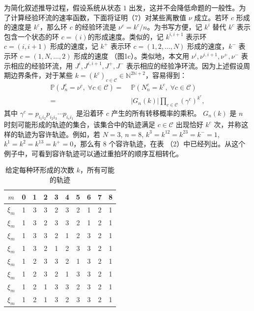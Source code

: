 为简化叙述推导过程，假设系统从状态 $1$ 出发，这并不会降低命题的一般性。为了计算经验环流的速率函数，下面将证明（7）对某些离散值 $\nu$ 成立。若环 $c$ 形成的速度是 $k^c$，那么环 $c$ 的经验环流是 $\nu^c = k^c /n$。为书写方便，记 $k^i$ 替代 $k^c$ 表示包含一个状态的环 $c=(i)$的形成速度。类似的，记 $k^{i,i+1}$ 表示环 $c=(i,i+1)$ 形成的速度，记 $k^+$ 表示环 $c=(1, 2, \dots ,N)$ 形成的速度，$k^-$ 表示环 $c=(1, N, \dots ,2)$ 形成的速度 （图1c）。类似地，本文用 $\nu^i, \nu^{i,i+1}, \nu^+, \nu^-$ 表示相应的经验环流，用 $J^i, J^{i, i+1}, J^{+}, J^{-}$ 表示相应的经验净环流。因为上述假设周期边界条件，对于某些 $k=(k^c)_{c \in \mathcal{C}} \in \mathbb{N}^{2 \mathbb{N}+2}$，容易得到：
\begin{equation}\label{joint}
    \begin{split}
    \mathbb{P}\left(J^c_n=\nu^c,\;\forall c\in\mathcal{C}\right)
    =&\;\mathbb{P}\left(N^c_n=k^c,\;\forall c\in\mathcal{C}\right)\\
    =&\;|G_n(k)|\prod_{c\in\mathcal{C}}\left(\gamma^c\right)^{k^c},
    \end{split}
\end{equation}
其中 $\gamma^c = p_{i_1i_2}p_{i_2i_3}\cdots p_{i_si_1}$ 是沿着环 $c$ 产生的所有转移概率的乘积。 $G_n(k)$ 是 $n$ 时刻可能形成的轨迹的集合，该集合中的轨迹满足 $c \in \mathcal{C}$ 出现恰好 $k^c$ 次，并称这样的轨迹为容许轨迹。例如，若 $N=3$, $n=8$, $k^3 = k^{12} = k^{23} = k^- = 1$, $k^1 = k^2 = k^{13} = k^+= 0$，那么有 8 个容许轨迹，在表 （2）中已经列出。从这个例子中，可看到容许轨迹可以通过重拍环的顺序互相转化。
\begin{table}[htb!]
    \renewcommand\arraystretch{1.2}
    \begin{tabular}{cccccccccc}
    \hline
    $m$    & 0 & 1 & 2 & 3 & 4 & 5 & 6 & 7 & 8 \\\hline
    $\xi_m$ & 1 & 3 & 3 & 2 & 3 & 2 & 1 & 2 & 1 \\\hline
    $\xi_m$ & 1 & 3 & 2 & 3 & 3 & 2 & 1 & 2 & 1 \\\hline
    $\xi_m$ & 1 & 3 & 3 & 2 & 1 & 2 & 3 & 2 & 1 \\\hline
    $\xi_m$ & 1 & 3 & 2 & 1 & 2 & 3 & 3 & 2 & 1 \\\hline
    $\xi_m$ & 1 & 2 & 3 & 3 & 2 & 1 & 3 & 2 & 1 \\\hline
    $\xi_m$ & 1 & 2 & 3 & 2 & 1 & 3 & 3 & 2 & 1 \\\hline
    $\xi_m$ & 1 & 2 & 1 & 3 & 3 & 2 & 3 & 2 & 1 \\\hline
    $\xi_m$ & 1 & 2 & 1 & 3 & 2 & 3 & 3 & 2 & 1 \\\hline
    \end{tabular}\centering
    \caption{给定每种环形成的次数 $k$，所有可能的轨迹}\label{table:all possible trajectories}
\end{table}
    
